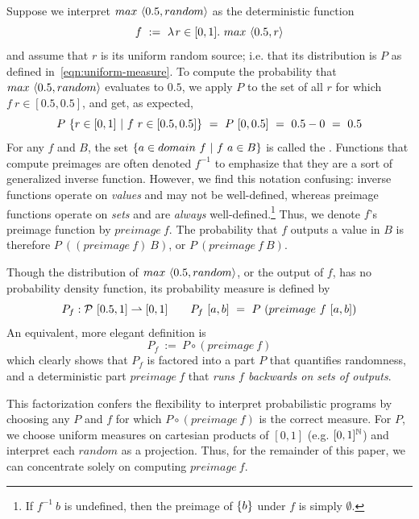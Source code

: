 \documentclass{llncs}
\newcommand{\pto}{\rightharpoonup}
\begin{document}
Suppose we interpret $max~\langle{0.5,random}\rangle$ as the deterministic function
\begin{equation}
	f\ :=\ \lambda\mspace{2mu}{r \in [0,1]}\ldotp\, max~\langle{0.5,r}\rangle
\label{eqn:max-random-manual-interp}
\end{equation}
and assume that $r$ is its uniform random source; i.e. that its distribution is $P$ as defined in~\eqref{eqn:uniform-measure}.
To compute the probability that $max~\langle{0.5,random}\rangle$ evaluates to $0.5$, we apply $P$ to the set of all $r$ for which $f~r \in [0.5,0.5]$, and get, as expected,
\begin{equation}
	P~\lbrace {r \in [0,1]} \ \lvert\ {f~r \in [0.5,0.5]} \rbrace\ =\ P~[0,0.5]\ =\ 0.5 - 0\ =\ 0.5
\end{equation}
For any $f$ and $B$, the set $\lbrace {a \in domain~f} \ \lvert\ {f~a \in B} \rbrace$ is called the .
Functions that compute preimages are often denoted $f^{-1}$ to emphasize that they are a sort of generalized inverse function.
However, we find this notation confusing: inverse functions operate on \emph{values} and may not be well-defined, whereas preimage functions operate on \emph{sets} and are \emph{always} well-defined.\footnote{If $f^{-1}~b$ is undefined, then the preimage of $\{{b}\}$ under $f$ is simply $\emptyset$.}
Thus, we denote $f$'s preimage function by $preimage~f$.
The probability that $f$ outputs a value in $B$ is therefore $P~((preimage~f)~B)$, or $P~(preimage~f~B)$.

Though the distribution of $max~\langle{0.5,random}\rangle$, or the output of $f$, has no probability density function, its probability measure is defined by
\begin{equation}
	P_f : \powerset~[0.5,1] \pto [0,1]\ \ \ \ \ \ P_f~[a,b]\ =\ P~(preimage~f~[a,b])
\end{equation}
An equivalent, more elegant definition is
\begin{equation}
	P_f\ :=\ P \circ (preimage~f)
\end{equation}
which clearly shows that $P_f$ is factored into a part $P$ that quantifies randomness, and a deterministic part $preimage~f$ that \emph{runs $f$ backwards on sets of outputs}.

This factorization confers the flexibility to interpret probabilistic programs by choosing any $P$ and $f$ for which $P \circ (preimage~f)$ is the correct measure.
For $P$, we choose uniform measures on cartesian products of $[0,1]$ (e.g. $[0,1]^{\mathbb{N}}$) and interpret each $random$ as a projection.
Thus, for the remainder of this paper, we can concentrate solely on computing $preimage~f$.
\end{document}
